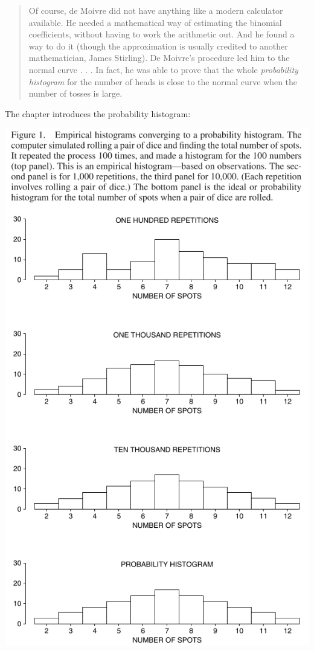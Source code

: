 \documentclass[
]{book}
\begin{document}
\begin{quote}
Of course, de Moivre did not have anything like a modern calculator available. He needed a mathematical way of estimating the binomial coefficients, without having to work the arithmetic out. And he found a way to do it (though the approximation is usually credited to another mathematician, James Stirling). De Moivre's procedure led him to the normal curve . . . In fact, he was able to prove that the whole \emph{probability histogram} for the number of heads is close to the normal curve when the number of tosses is large.
\end{quote}

The chapter introduces the probability histogram:

\includegraphics{images/Ch18Img01.png}
\end{document}
